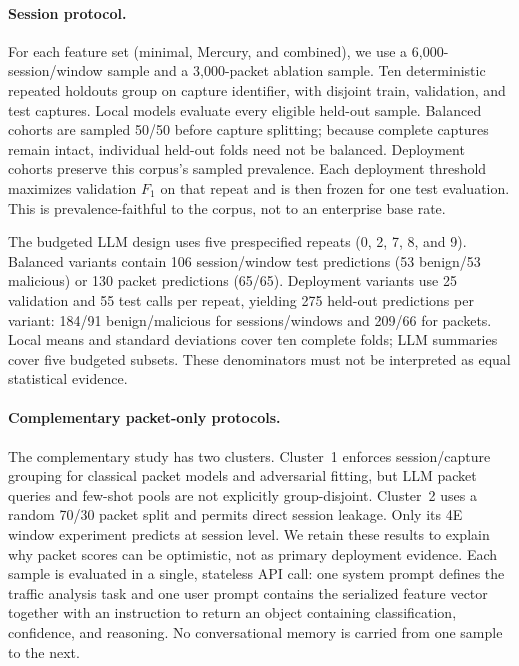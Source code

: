 \documentclass[letterpaper,twocolumn,10pt]{article}
\begin{document}
\paragraph{Session protocol.}
For each feature set (minimal, Mercury, and combined), we use a 6{,}000-session/window sample and a 3{,}000-packet ablation sample. Ten deterministic repeated holdouts group on capture identifier, with disjoint train, validation, and test captures. Local models evaluate every eligible held-out sample. Balanced cohorts are sampled 50/50 before capture splitting; because complete captures remain intact, individual held-out folds need not be balanced. Deployment cohorts preserve this corpus's sampled prevalence. Each deployment threshold maximizes validation $F_1$ on that repeat and is then frozen for one test evaluation. This is prevalence-faithful to the corpus, not to an enterprise base rate.

The budgeted LLM design uses five prespecified repeats (0, 2, 7, 8, and 9). Balanced variants contain 106 session/window test predictions (53 benign/53 malicious) or 130 packet predictions (65/65). Deployment variants use 25 validation and 55 test calls per repeat, yielding 275 held-out predictions per variant: 184/91 benign/malicious for sessions/windows and 209/66 for packets. Local means and standard deviations cover ten complete folds; LLM summaries cover five budgeted subsets. These denominators must not be interpreted as equal statistical evidence.

\paragraph{Complementary packet-only protocols.}
The complementary study has two clusters. Cluster~1 enforces session/capture grouping for classical packet models and adversarial fitting, but LLM packet queries and few-shot pools are not explicitly group-disjoint. Cluster~2 uses a random 70/30 packet split and permits direct session leakage. Only its 4E window experiment predicts at session level. We retain these results to explain why packet scores can be optimistic, not as primary deployment evidence. Each sample is evaluated in a single, stateless API call: one system prompt defines the traffic analysis task and one user prompt contains the serialized feature vector together with an instruction to return an object containing classification, confidence, and reasoning. No conversational memory is carried from one sample to the next. 
\end{document}
